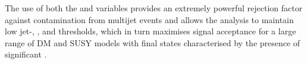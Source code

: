 The use of both the \bdphi and \alphat variables provides an extremely
powerful rejection factor against contamination from multijet events
and allows the analysis to maintain low jet-\PT, \HT, and \mht thresholds, which in
turn maximises signal acceptance for a large range of DM and SUSY
models with final states characterised by the presence of significant
\met.

